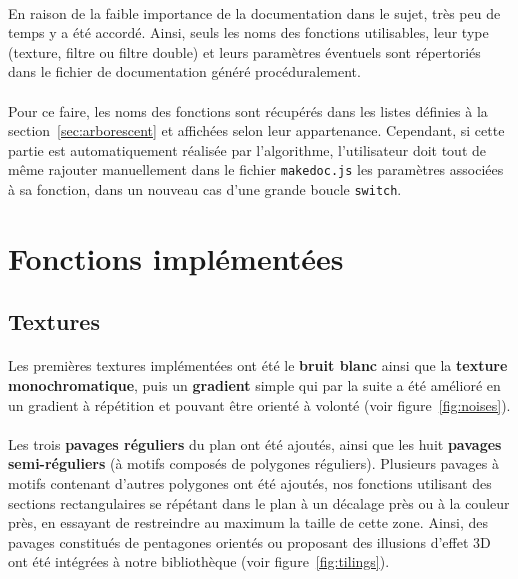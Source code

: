 \documentclass[a4paper]{article}
\begin{document}
\paragraph{}
En raison de la faible importance de la documentation dans le sujet, très peu de temps y a été accordé. Ainsi, seuls les noms des fonctions utilisables, leur type (texture, filtre ou filtre double) et leurs paramètres éventuels sont répertoriés dans le fichier de documentation généré procéduralement.

\paragraph{}
Pour ce faire, les noms des fonctions sont récupérés dans les listes définies à la section~\ref{sec:arborescent} et affichées selon leur appartenance. Cependant, si cette partie est automatiquement réalisée par l'algorithme, l'utilisateur doit tout de même rajouter manuellement dans le fichier \texttt{makedoc.js} les paramètres associées à sa fonction, dans un nouveau cas d'une grande boucle \texttt{switch}.



\section{Fonctions implémentées}

\subsection{Textures}
\label{sec:textures}

\paragraph{}
Les premières textures implémentées ont été le \textbf{bruit blanc} ainsi que la \textbf{texture monochromatique}, puis un \textbf{gradient} simple qui par la suite a été amélioré en un gradient à répétition et pouvant être orienté à volonté (voir figure~\ref{fig:noises}).

\paragraph{}
Les trois \textbf{pavages réguliers} du plan ont été ajoutés, ainsi que les huit \textbf{pavages semi-réguliers}\cite{regularTiling} (à motifs composés de polygones réguliers). Plusieurs pavages à motifs contenant d'autres polygones ont été ajoutés, nos fonctions utilisant des sections rectangulaires se répétant dans le plan à un décalage près ou à la couleur près, en essayant de restreindre au maximum la taille de cette zone. Ainsi, des pavages constitués de pentagones orientés ou proposant des illusions d'effet 3D ont été intégrées à notre bibliothèque (voir figure~\ref{fig:tilings}).
\end{document}
